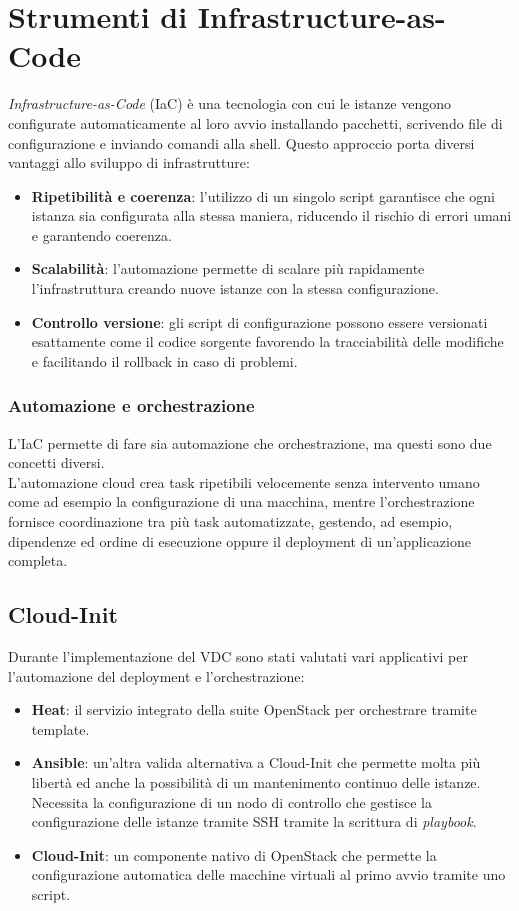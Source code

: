 \documentclass[12pt,a4paper,openright,twoside]{book}
\begin{document}
\section{Strumenti di Infrastructure-as-Code}
\textit{Infrastructure-as-Code} (IaC) è una tecnologia con cui le istanze vengono configurate automaticamente al loro avvio installando pacchetti, scrivendo file di configurazione e inviando comandi alla shell.
Questo approccio porta diversi vantaggi allo sviluppo di infrastrutture\cite{cacciaguerra2024iac}:
\begin{itemize}
    \item{
        \textbf{Ripetibilità e coerenza}: l'utilizzo di un singolo script garantisce che ogni istanza sia configurata alla stessa maniera,
        riducendo il rischio di errori umani e garantendo coerenza.
    }
    \item{
        \textbf{Scalabilità}: l'automazione permette di scalare più rapidamente l'infrastruttura creando nuove istanze con la stessa configurazione.
    }
    \item{
        \textbf{Controllo versione}: gli script di configurazione possono essere versionati esattamente come il codice sorgente favorendo la tracciabilità delle modifiche e facilitando il rollback in caso di problemi.
    }
\end{itemize}
\subsubsection{Automazione e orchestrazione}
L'IaC permette di fare sia automazione che orchestrazione, ma questi sono due concetti diversi.\\
L'automazione cloud crea task ripetibili velocemente senza intervento umano come ad esempio la configurazione di una macchina,
mentre l'orchestrazione fornisce coordinazione tra più task automatizzate, gestendo, ad esempio, dipendenze ed ordine di esecuzione
oppure il deployment di un'applicazione completa\cite{cacciaguerra2024iac}.

\subsection{Cloud-Init}
Durante l'implementazione del VDC sono stati valutati vari applicativi per l'automazione del deployment e l'orchestrazione:
\begin{itemize}
    \item \textbf{Heat}: il servizio integrato della suite OpenStack per orchestrare tramite template.
    \item {
        \textbf{Ansible}: un'altra valida alternativa a Cloud-Init che permette molta più libertà ed anche la possibilità di un mantenimento continuo delle istanze. 
        Necessita la configurazione di un nodo di controllo che gestisce la configurazione delle istanze tramite SSH tramite la scrittura di \textit{playbook}.
    }
    \item{
        \textbf{Cloud-Init}: un componente nativo di OpenStack che permette la configurazione automatica delle macchine virtuali al primo avvio tramite uno script. 
    }
\end{itemize}
\end{document}
